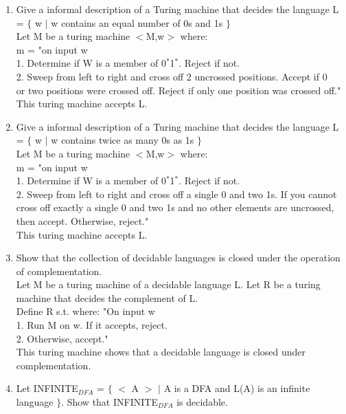 \documentclass[12pt]{article}
\begin{document}
\begin{enumerate}
	
	\item Give a informal description of a Turing machine that decides the language L = $\{$ w $|$ w contains an equal number of 0s and 1s $\}$ \\ 
	
	Let M be a turing machine $<$M,w$>$ where: \\
		\tabto{1cm}m = "on input w\\
			\tabto{2cm}1. Determine if W is a member of 0$^*$1$^*$. Reject if not.\\
			\tabto{2cm}2. Sweep from left to right and cross off 2 uncrossed positions. Accept if 0\\ 			   \tabto{2cm}or two positions were crossed off. Reject if only one position was crossed \tabto{2cm}off."\\
			This turing machine accepts L.
			
	\item Give a informal description of a Turing machine that decides the language L = $\{$ w $|$ w contains twice as many 0s as 1s $\}$ \\ 
	
	Let M be a turing machine $<$M,w$>$ where: \\
		\tabto{1cm}m = "on input w\\
			\tabto{2cm}1. Determine if W is a member of 0$^*$1$^*$. Reject if not.\\
			\tabto{2cm}2. Sweep from left to right and cross off a single 0 and two 1s. If you \tabto{2cm}cannot cross off exactly a single 0 and two 1s and no other elements are \tabto{2cm}uncrossed, then accept. Otherwise, reject." \\
			This turing machine accepts L.
	
	\item Show that the collection of decidable languages is closed under the operation of
complementation. \\

	Let M be a turing machine of a decidable language L. Let R be a turing machine that decides the complement of L. \\
	
	\tabto{1cm}Define R s.t. where: "On input w \\
		\tabto{2cm}1. Run M on w. If it accepts, reject. \\
		\tabto{2cm}2. Otherwise, accept." \\
	
	This turing machine shows that a decidable language is closed under complementation.
	\pagebreak
	\item Let INFINITE$_{DFA}$ = $\{$ $<$ A $>$ $|$ A is a DFA and L(A) is an infinite language $\}$. Show that INFINITE$_{DFA}$ is decidable. \\ 
	

\end{enumerate}
\end{document}
